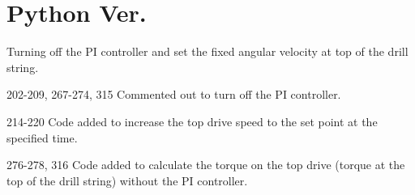 \section{Python Ver.\ }
Turning off the PI controller and set the fixed angular velocity at top of the drill string.

\begin{codemodifications}

\begin{codemodification}{202-209, 267-274, 315}
Commented out to turn off the PI controller.
\end{codemodification}
\begin{codemodification}{214-220}
Code added to increase the top drive speed to the set point at the specified time.
\end{codemodification}
\begin{codemodification}{276-278, 316}
Code added to calculate the torque on the top drive (torque at the top of the drill string) without the PI controller.
\end{codemodification}
\end{codemodifications} 